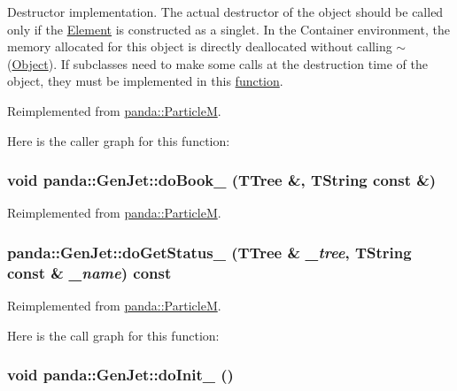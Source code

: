 Destructor implementation. The actual destructor of the object should be called only if the \hyperlink{classpanda_1_1Element}{Element} is constructed as a singlet. In the Container environment, the memory allocated for this object is directly deallocated without calling $\sim$(\hyperlink{classpanda_1_1Object}{Object}). If subclasses need to make some calls at the destruction time of the object, they must be implemented in this \hyperlink{namespacepanda_1_1function}{function}. 

Reimplemented from \hyperlink{classpanda_1_1ParticleM_abef15d28e6e33ee92c0b318bd41af2ca}{panda::ParticleM}.

Here is the caller graph for this function:\hypertarget{classpanda_1_1GenJet_a59196025df6d85eb481e9c47c681e0d7}{
\subsubsection[{doBook\_\-}]{\setlength{\rightskip}{0pt plus 5cm}void panda::GenJet::doBook\_\- (TTree \&, \/  TString const \&)}}
\label{classpanda_1_1GenJet_a59196025df6d85eb481e9c47c681e0d7}


Reimplemented from \hyperlink{classpanda_1_1ParticleM_a55d6e7e91edbc88e980a0031c299ef18}{panda::ParticleM}.\hypertarget{classpanda_1_1GenJet_a5f514a9289d97bd7b6b8731323143269}{
\subsubsection[{doGetStatus\_\-}]{ panda::GenJet::doGetStatus\_\- (TTree \& {\em \_\-tree}, \/  TString const \& {\em \_\-name}) const}}
\label{classpanda_1_1GenJet_a5f514a9289d97bd7b6b8731323143269}


Reimplemented from \hyperlink{classpanda_1_1ParticleM_a003a63672058369e9bbea413e055b1c1}{panda::ParticleM}.

Here is the call graph for this function:\hypertarget{classpanda_1_1GenJet_a7d11efd32c760d452e8014c33ba3b64d}{
\subsubsection[{doInit\_\-}]{\setlength{\rightskip}{0pt plus 5cm}void panda::GenJet::doInit\_\- ()}}
\label{classpanda_1_1GenJet_a7d11efd32c760d452e8014c33ba3b64d}


